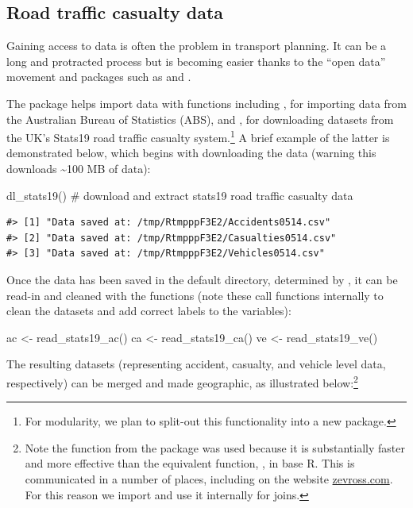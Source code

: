 \subsection{Road traffic casualty data}\label{accessing-and-processing-transport-data}

Gaining access to data is often the problem in transport planning.
It can be a long and protracted process but is becoming
easier thanks to the ``open data'' movement and packages such as
 and 
\citep{walker_tigris:_2016}.

The  package helps import data with functions including
, for importing data from the
Australian Bureau of Statistics (ABS), and
, for downloading datasets from the UK's Stats19 road traffic
casualty system.\footnote{
For modularity, we plan to split-out this functionality into a new package.
}
A brief example of the latter is demonstrated below,
which begins with downloading the data (warning this downloads
\textasciitilde{}100 MB of data):

\begin{Schunk}
\begin{Sinput}
dl_stats19() # download and extract stats19 road traffic casualty data
\end{Sinput}
\end{Schunk}

\begin{verbatim}
#> [1] "Data saved at: /tmp/RtmpppF3E2/Accidents0514.csv"
#> [2] "Data saved at: /tmp/RtmpppF3E2/Casualties0514.csv"
#> [3] "Data saved at: /tmp/RtmpppF3E2/Vehicles0514.csv"
\end{verbatim}

Once the data has been saved in the default directory, determined by
, it can be read-in and cleaned with the
 functions (note these call
 functions internally to clean the datasets
and add correct labels to the variables):

\begin{Schunk}
\begin{Sinput}
ac <- read_stats19_ac()
ca <- read_stats19_ca()
ve <- read_stats19_ve()
\end{Sinput}
\end{Schunk}

The resulting datasets (representing accident, casualty, and vehicle
level data, respectively) can be merged and made geographic, as
illustrated below:\footnote{
Note the  function from the  package was used because it is substantially faster and more effective than the equivalent function, , in base R.
This is communicated in a number of places, including on the website \href{http://zevross.com/blog/2014/04/30/mini-post-for-large-tables-in-r-dplyrs-function-inner_join-is-much-faster-than-merge/}{zevross.com}. For this reason we import  and use it internally for joins.}

